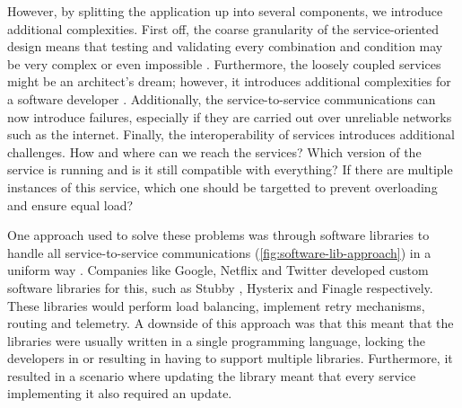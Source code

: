 However, by splitting the application up into several components, we introduce additional complexities. First off, the coarse granularity of the service-oriented design means that testing and validating every combination and condition may be very complex or even impossible \cite{mahmood2007service}. Furthermore, the loosely coupled services might be an architect's dream; however, it introduces additional complexities for a software developer \cite{fowler2012patterns}. Additionally, the service-to-service communications can now introduce failures, especially if they are carried out over unreliable networks such as the internet. Finally, the interoperability of services introduces additional challenges. How and where can we reach the services? Which version of the service is running and is it still compatible with everything? If there are multiple instances of this service, which one should be targetted to prevent overloading and ensure equal load? 



One approach used to solve these problems was through software libraries to handle all service-to-service communications (\cref{fig:software-lib-approach}) in a uniform way \cite{service-mesh-history}. Companies like Google, Netflix and Twitter developed custom software libraries for this, such as Stubby \cite{stubby}, Hysterix \cite{hysterix} and Finagle \cite{finagle} respectively. These libraries would perform load balancing, implement retry mechanisms, routing and telemetry. A downside of this approach was that this meant that the libraries were usually written in a single programming language, locking the developers in or resulting in having to support multiple libraries. Furthermore, it resulted in a scenario where updating the library meant that every service implementing it also required an update. 



